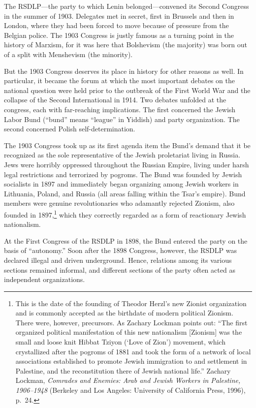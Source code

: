 The RSDLP---the party to which Lenin belonged---convened its Second Congress in the summer of 1903. Delegates met in secret, first in Brussels and then in London, where they had been forced to move because of pressure from the Belgian police. The 1903 Congress is justly famous as a turning point in the history of Marxism, for it was here that Bolshevism (the majority) was born out of a split with Menshevism (the minority).

But the 1903 Congress deserves its place in history for other reasons as well. In particular, it became the forum at which the most important debates on the national question were held prior to the outbreak of the First World War and the collapse of the Second International in 1914. Two debates unfolded at the congress, each with far-reaching implications. The first concerned the Jewish Labor Bund (``bund'' means ``league'' in Yiddish) and party organization. The second concerned Polish self-determination.

The 1903 Congress took up as its first agenda item the Bund's demand that it be recognized as the sole representative of the Jewish proletariat living in Russia. Jews were horribly oppressed throughout the Russian Empire, living under harsh legal restrictions and terrorized by pogroms. The Bund was founded by Jewish socialists in 1897 and immediately began organizing among Jewish workers in Lithuania, Poland, and Russia (all areas falling within the Tsar's empire). Bund members were genuine revolutionaries who adamantly rejected Zionism, also founded in 1897,\footnote{This is the date of the founding of Theodor Herzl's new Zionist organization and is commonly accepted as the birthdate of modern political Zionism. There were, however, precursors. As Zachary Lockman points out: ``The first organized political manifestation of this new nationalism [Zionism] was the small and loose knit Hibbat Tziyon (`Love of Zion') movement, which crystallized after the pogroms of 1881 and took the form of a network of local associations established to promote Jewish immigration to and settlement in Palestine, and the reconstitution there of Jewish national life.'' Zachary Lockman, \emph{Comrades and Enemies: Arab and Jewish Workers in Palestine, 1906--1948} (Berkeley and Los Angeles: University of California Press, 1996), p.\ 24.} which they correctly regarded as a form of reactionary Jewish nationalism.

At the First Congress of the RSDLP in 1898, the Bund entered the party on the basis of ``autonomy.'' Soon after the 1898 Congress, however, the RSDLP was declared illegal and driven underground. Hence, relations among its various sections remained informal, and different sections of the party often acted as independent organizations.

